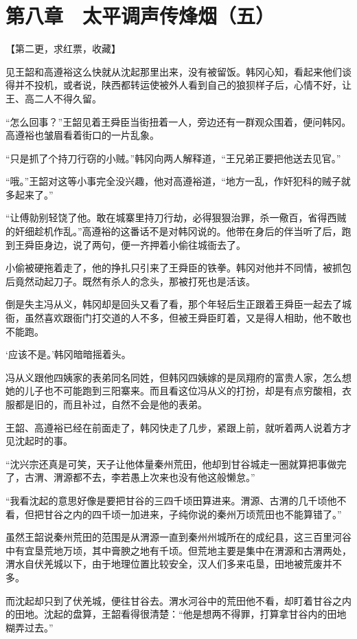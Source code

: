 \section{第八章　太平调声传烽烟（五）}

【第二更，求红票，收藏】

见王韶和高遵裕这么快就从沈起那里出来，没有被留饭。韩冈心知，看起来他们谈得并不投机，或者说，陕西都转运使被外人看到自己的狼狈样子后，心情不好，让王、高二人不得久留。

“怎么回事？”王韶见着王舜臣当街扭着一人，旁边还有一群观众围着，便问韩冈。高遵裕也皱眉看着街口的一片乱象。

“只是抓了个持刀行窃的小贼。”韩冈向两人解释道，“王兄弟正要把他送去见官。”

“哦。”王韶对这等小事完全没兴趣，他对高遵裕道，“地方一乱，作奸犯科的贼子就多起来了。”

“让傅勍别轻饶了他。敢在城寨里持刀行劫，必得狠狠治罪，杀一儆百，省得西贼的奸细趁机作乱。”高遵裕的这番话不是对韩冈说的。他带在身后的伴当听了后，跑到王舜臣身边，说了两句，便一齐押着小偷往城衙去了。

小偷被硬拖着走了，他的挣扎只引来了王舜臣的铁拳。韩冈对他并不同情，被抓包后竟然动起刀子。既然有杀人的念头，那被打死也是活该。

倒是失主冯从义，韩冈却是回头又看了看，那个年轻后生正跟着王舜臣一起去了城衙，虽然喜欢跟衙门打交道的人不多，但被王舜臣盯着，又是得人相助，他不敢也不能跑。

‘应该不是。’韩冈暗暗摇着头。

冯从义跟他四姨家的表弟同名同姓，但韩冈四姨嫁的是凤翔府的富贵人家，怎么想她的儿子也不可能跑到三阳寨来。而且看这位冯从义的打扮，却是有点穷酸相，衣服都是旧的，而且补过，自然不会是他的表弟。

王韶、高遵裕已经在前面走了，韩冈快走了几步，紧跟上前，就听着两人说着方才见沈起时的事。

“沈兴宗还真是可笑，天子让他体量秦州荒田，他却到甘谷城走一圈就算把事做完了，古渭、渭源都不去，李若愚上次来也没有他这般懒怠。”

“我看沈起的意思好像是要把甘谷的三四千顷田算进来。渭源、古渭的几千顷他不看，但把甘谷之内的四千顷一加进来，子纯你说的秦州万顷荒田也不能算错了。”

虽然王韶说秦州荒田的范围是从渭源一直到秦州州城所在的成纪县，这三百里河谷中有宜垦荒地万顷，其中膏腴之地有千顷。但荒地主要是集中在渭源和古渭两处，渭水自伏羌城以下，由于地理位置比较安全，汉人们多来屯垦，田地被荒废并不多。

而沈起却只到了伏羌城，便往甘谷去。渭水河谷中的荒田他不看，却盯着甘谷之内的田地。沈起的盘算，王韶看得很清楚：“他是想两不得罪，打算拿甘谷内的田地糊弄过去。”

